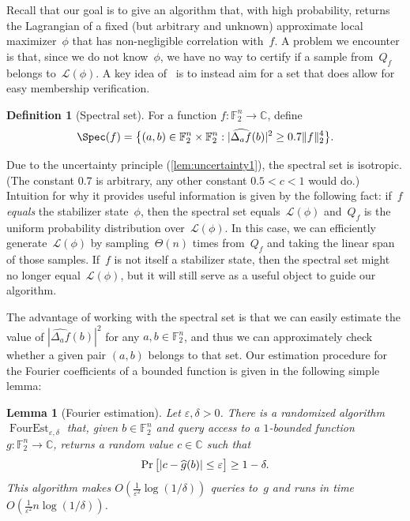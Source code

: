 \documentclass[11pt]{amsart}
\renewcommand{\Pr}{\mathop{\mbox{\rm Pr}}}
\newcommand{\C}{\mathbb{C}} %
\newcommand{\F}{\mathbb{F}} %
\newcommand{\eps}{\varepsilon}
\DeclareMathOperator{\FourEst}{FourEst}
\theoremstyle{plain}
\newtheorem{lemma}[theorem]{Lemma}
\theoremstyle{definition}
\newtheorem{definition}[theorem]{Definition}
\theoremstyle{remark}
\begin{document}
Recall that our goal is to give an algorithm that, with high probability, returns the Lagrangian of a fixed (but arbitrary and unknown) approximate local maximizer~$\phi$ that has non-negligible correlation with~$f$.
A problem we encounter is that, since we do not know~$\phi$, we have no way to certify if a sample from~$Q_f$ belongs to~$\mathcal L(\phi)$.
A key idea of~\cite{chen2024stabilizer} is to instead aim for a set that does allow for easy membership verification.

\begin{definition}[Spectral set]
    For a function $f:\F_2^n\to \C$, define
    \begin{equation*}
        \Spec(f) = \big\{(a,b)\in \F_2^n\times\F_2^n : |\widehat{\Delta_af}(b)|^2 \geq 0.7 \|f\|_2^4\big\}.
    \end{equation*}
\end{definition}

Due to the uncertainty principle (\cref{lem:uncertainty1}), the spectral set is isotropic.
(The constant 0.7 is arbitrary, any other constant $0.5 < c < 1$ would do.)
Intuition for why it provides useful information is given by the following fact:
if~$f$ \emph{equals} the stabilizer state~$\phi$, then the spectral set equals~$\mathcal L(\phi)$ and~$Q_f$ is the uniform probability distribution over~$\mathcal L(\phi)$.
In this case, we can efficiently generate~$\mathcal L(\phi)$ by sampling~$\Theta(n)$ times from~$Q_f$ and taking the linear span of those samples.
If~$f$ is not itself a stabilizer state, then the spectral set might no longer equal~$\mathcal L(\phi)$, but it will still serve as a useful object to guide our algorithm.

The advantage of working with the spectral set is that we can easily estimate the value of $|\widehat{\Delta_af}(b)|^2$ for any $a, b\in \F_2^n$, and thus we can approximately check whether a given pair $(a, b)$ belongs to that set.
Our estimation procedure for the Fourier coefficients of a bounded function is given in the following simple lemma:


\begin{lemma}[Fourier estimation] \label{lem:fourest}
    Let $\eps, \delta>0$.
    There is a randomized algorithm $\FourEst_{\eps,\delta}$ that, given $b\in \F_2^n$ and query access to a $1$-bounded function $g:\F_2^n\to \C$, returns a random value $c\in \C$ such that
    $$\Pr\big[|c - \widehat{g}(b)|\leq \eps\big] \geq 1-\delta.$$
    This algorithm makes $O(\frac{1}{\eps^2}\log(1/\delta))$ queries to~$g$ and runs in time $O(\frac{1}{\eps^2} n\log(1/\delta))$.
\end{lemma}
\end{document}
